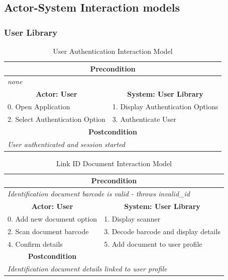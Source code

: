 \newpage

\subsection{Actor-System Interaction models}

\subsubsection{User Library}

\begin{table}[H]
\centering
\begin{tabular}{|l|l|}
\hline
\multicolumn{2}{|c|}{\textbf{Precondition}}                                         \\ \hline
\multicolumn{2}{|l|}{\textit{none}}                                                 \\ \hline
\multicolumn{1}{|c|}{\textbf{Actor: User}} & \multicolumn{1}{c|}{\textbf{System: User Library}} \\ \hline
0. Open Application                             & 1. Display Authentication Options \\ \hline
2. Select Authentication Option & 3. Authenticate User              \\ \hline
\multicolumn{2}{|c|}{\textbf{Postcondition}}                                        \\ \hline
\multicolumn{2}{|l|}{\textit{User authenticated and session started}}               \\ \hline
\end{tabular}
\caption{User Authentication Interaction Model}
\label{tab:user_authentication_interaction}
\end{table}

\begin{table}[H]
\centering
\begin{tabular}{|l|l|}
\hline
\multicolumn{2}{|c|}{\textbf{Precondition}}                                                \\ \hline
\multicolumn{2}{|l|}{\textit{Identification document barcode is valid - throws invalid\_id}}    \\ \hline
\multicolumn{1}{|c|}{\textbf{Actor: User}} & \multicolumn{1}{c|}{\textbf{System: User Library}} \\ \hline
0. Add new document option & 1. Display scanner                      \\ \hline
2. Scan document barcode    & 3. Decode barcode and display details              \\ \hline
4. Confirm details                               & 5. Add document to user profile \\ \hline
\multicolumn{1}{|c|}{\textbf{Postcondition}}     &                                         \\ \hline
\multicolumn{2}{|l|}{\textit{Identification document details linked to user profile}}           \\ \hline
\end{tabular}
\caption{Link ID Document Interaction Model}
\label{tab:link_id_interaction}
\end{table}

